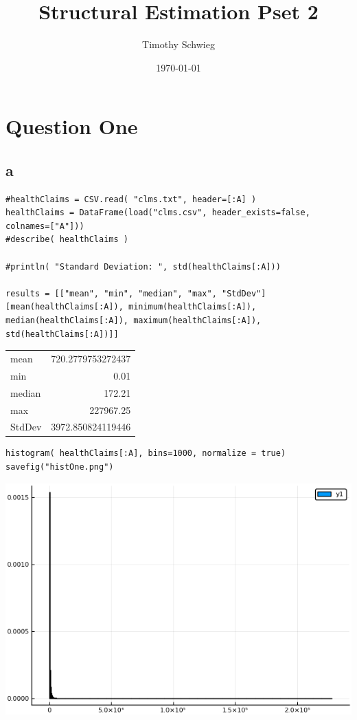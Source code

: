 \documentclass[12pt, letterpaper]{paper}
\author{Timothy Schwieg}
\date{\today}
\title{Structural Estimation Pset 2}
\begin{document}
\maketitle

\section{Question One}
\label{sec:orgb4f4da2}
\subsection{a}
\label{sec:orgb6af895}
\begin{verbatim}
#healthClaims = CSV.read( "clms.txt", header=[:A] )
healthClaims = DataFrame(load("clms.csv", header_exists=false, colnames=["A"]))
#describe( healthClaims )

#println( "Standard Deviation: ", std(healthClaims[:A]))

results = [["mean", "min", "median", "max", "StdDev"] [mean(healthClaims[:A]), minimum(healthClaims[:A]), median(healthClaims[:A]), maximum(healthClaims[:A]), std(healthClaims[:A])]]
\end{verbatim}

\begin{center}
\begin{tabular}{lr}
mean & 720.2779753272437\\
min & 0.01\\
median & 172.21\\
max & 227967.25\\
StdDev & 3972.850824119446\\
\end{tabular}
\end{center}

\begin{verbatim}
histogram( healthClaims[:A], bins=1000, normalize = true)
savefig("histOne.png")
\end{verbatim}

\begin{center}
\includegraphics[width=.9\linewidth]{histOne.png}
\end{center}
\end{document}
